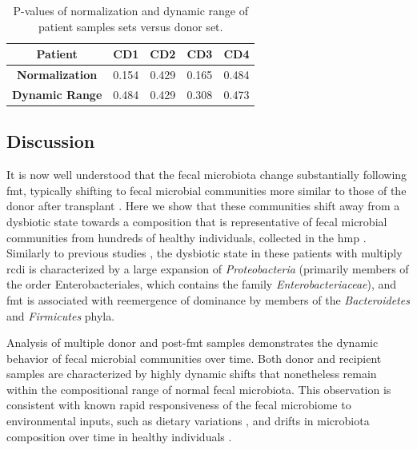 \begin{table}[hbtp]
    \caption{P-values of normalization and dynamic range of patient samples sets versus donor set.}
    \label{moviefmt-tab1}
    \centering
    \begin{tabular}{ccccc}
    \toprule
        \textbf{Patient} &    CD1 &    CD2 &    CD3 & CD4\\
    \midrule
        \textbf{Normalization} &    0.154 & 0.429 &    0.165 & 0.484\\
        \textbf{Dynamic Range} &    0.484 & 0.429 &    0.308 & 0.473\\
    \bottomrule
    \end{tabular}
    
\end{table}

\subsection{Discussion}
It is now well understood that the fecal microbiota change substantially following \gls{fmt}, typically shifting to fecal microbial communities more similar to those of the donor after transplant \cite{RN53moviefmt, RN30, RN66, RN31, RN36, RN4129, RN1}. Here we show that these communities shift away from a dysbiotic state towards a composition that is representative of fecal microbial communities from hundreds of healthy individuals, collected in the \gls{hmp} \cite{RN4040}. Similarly to previous studies \cite{RN53moviefmt, RN30, RN31, RN4129, RN1}, the dysbiotic state in these patients with multiply \gls{rcdi} is characterized by a large expansion of \textit{Proteobacteria} (primarily members of the order Enterobact\textit{}eriales, which contains the family \textit{Enterobacteriaceae}), and \gls{fmt} is associated with reemergence of dominance by members of the \textit{Bacteroidetes} and \textit{Firmicutes} phyla.

Analysis of multiple donor and post-\gls{fmt} samples demonstrates the dynamic behavior of fecal microbial communities over time. Both donor and recipient samples are characterized by highly dynamic shifts that nonetheless remain within the compositional range of normal fecal microbiota. This observation is consistent with known rapid responsiveness of the fecal microbiome to environmental inputs, such as dietary variations \cite{RN4235}, and drifts in microbiota composition over time in healthy individuals \cite{RN84}. 

